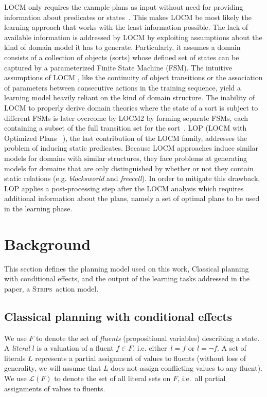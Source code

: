 \documentclass[3p,times]{elsarticle}
\newcommand{\strips}{\textsc{Strips}}     %
\begin{document}
{\sf LOCM} only requires the example plans as input without need for providing information about predicates or states~\cite{cresswell2013acquiring}. This makes {\sf LOCM} be most likely the learning approach that works with the least information possible. The lack of available information is addressed by LOCM by exploiting assumptions about the kind of domain model it has to generate. Particularly, it assumes a domain consists of a collection of objects (sorts) whose defined set of states can be captured by a parameterized Finite State Machine (FSM). The intuitive assumptions of {\sf LOCM}
, like the continuity of object transitions or the association of parameters between consecutive actions in the training sequence,
yield a learning model heavily reliant on the kind of domain structure. The inability of {\sf LOCM} to properly derive domain theories where the state of a sort is subject to different FSMs is later overcome by {\sf LOCM2} by forming separate FSMs, each containing a subset of the full transition set for the sort~\cite{cresswell2011generalised}. {\sf LOP} ({\sf LOCM} with Optimized Plans ~\cite{gregory2015domain}), the last contribution of the {\sf LOCM} family, addresses the problem of inducing static predicates. Because {\sf LOCM} approaches induce similar models for domains with similar structures, they face problems at generating models for domains that are only distinguished by whether or not they contain static relations (e.g. {\em blocksworld} and {\em freecell}). In order to mitigate this drawback, {\sf LOP} applies a post-processing step after the {\sf LOCM} analysis which requires additional information about the plans, namely a set of optimal plans to be used in the learning phase.


\section{Background}
\label{sec:Section3}
This section defines the planning model used on this work, Classical planning with conditional effects, and the output of the learning tasks addressed in the paper, a \strips\ action model.

\subsection{Classical planning with conditional effects}
We use $F$ to denote the set of {\em fluents} (propositional variables) describing a state. A {\em literal} $l$ is a valuation of a fluent $f\in F$, i.e. either~$l=f$ or $l=\neg f$. A set of literals $L$ represents a partial assignment of values to fluents (without loss of generality, we will assume that $L$ does not assign conflicting values to any fluent). We use $\mathcal{L}(F)$ to denote the set of all literal sets on $F$, i.e.~all partial assignments of values to fluents.
\end{document}
